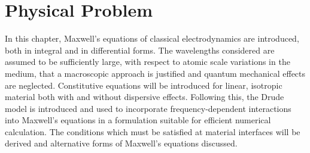 \chapter{Physical Problem}
\label{PhysicalProblemChapter}
 In this chapter, Maxwell's equations
of classical electrodynamics are introduced, both in integral and in differential
forms. The wavelengths considered are assumed to be sufficiently large, with respect to
atomic scale variations in the medium, that a macroscopic approach is justified
and quantum mechanical effects are neglected. Constitutive equations will be
introduced for linear, isotropic material both with and without dispersive
effects. Following this, the Drude model is introduced and used to incorporate
frequency-dependent interactions into Maxwell's equations in a formulation
suitable for efficient numerical calculation. The conditions which must be
satisfied at material interfaces will be derived and alternative forms of
Maxwell's equations discussed.


